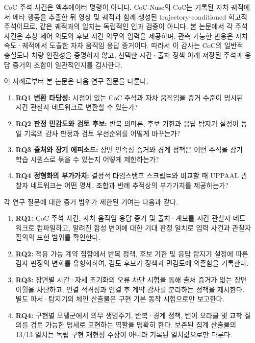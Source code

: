 CoC 주석 사건은 액추에이터 명령이 아니다. CoC-Nusc의 CoC는 기록된 자차 궤적에서 메타 행동을 추출한 뒤 영상 및 궤적과 함께 생성된 trajectory-conditioned 회고적 주석이므로, 같은 궤적과의 일치는 독립적인 인과 검증이 아니다. 본 논문에서 각 주석 사건은 추상 제어 의도와 후보 시간 의무의 입력을 제공하며, 관측 가능한 반응은 자차 속도·궤적에서 도출한 자차 움직임 응답 증거이다. 따라서 이 감사는 CoC의 일반적 충실도나 차량 안전성을 증명하지 않고, 선택한 시간·출처 정책 아래 저장된 주석과 응답 증거의 조합이 일관적인지를 검사한다.

이 사례로부터 본 논문은 다음 연구 질문을 다룬다.
\begin{enumerate}
    \item \textbf{RQ1 변환 타당성:} 시점이 있는 CoC 주석과 자차 움직임을 증거 수준이 명시된 시간 관찰자 네트워크로 변환할 수 있는가?
    \item \textbf{RQ2 판정 민감도와 검토 후보:} 반복 의미론, 후보 기한과 응답 탐지기 설정이 동일 기록의 감사 판정과 검토 우선순위를 어떻게 바꾸는가?
    \item \textbf{RQ3 출처와 장기 에피소드:} 장면 연속성 증거와 경계 정책은 어떤 주석을 장기 학습 시퀀스로 묶을 수 있는지 어떻게 제한하는가?
    \item \textbf{RQ4 정형화의 부가가치:} 결정적 타임스탬프 스크립트와 비교할 때 UPPAAL 관찰자 네트워크는 어떤 명세, 조합과 반례 추적상의 부가가치를 제공하는가?
\end{enumerate}

각 연구 질문에 대한 증거 범위가 제한된 기여는 다음과 같다.
\begin{enumerate}
    \item \textbf{RQ1:} CoC 주석 사건, 자차 움직임 응답 증거 및 출처·계보를 시간 관찰자 네트워크로 컴파일하고, 알려진 합성 변이에 대한 기대 판정 일치로 입력 사건과 관찰자 질의의 표현 범위를 확인한다.
    \item \textbf{RQ2:} 적용 가능 계약 집합에서 반복 정책, 후보 기한 및 응답 탐지기 설정에 따른 감사 판정의 변화를 유형화하여, 검토 후보가 정책과 민감도에 의존함을 기록한다.
    \item \textbf{RQ3:} 장면별 시간·자세 초기화의 오류 차단 시험을 통해 출처 증거가 없는 장면 이월을 차단하고, 연결 적격성과 연결 후 계약 감사를 분리하는 정책을 제시한다. 별도 파서·탐지기의 체인 산출물은 구현 기본 동작 시험으로만 보고한다.
    \item \textbf{RQ4:} 구현별 모델군에서 의무 생명주기, 반복·경계 정책, 변이 오라클 및 교착 질의를 검토 가능한 명세로 표현하는 역할을 명확히 한다. 보존된 집계 산출물의 13/13 일치는 독립 구현 재현성 주장이 아니라 기록된 일치값으로만 다룬다.
\end{enumerate}

